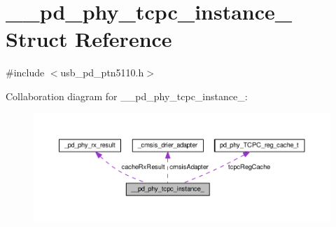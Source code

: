 \hypertarget{struct____pd__phy__tcpc__instance__}{\section{\-\_\-\-\_\-pd\-\_\-phy\-\_\-tcpc\-\_\-instance\-\_\- Struct Reference}
\label{struct____pd__phy__tcpc__instance__}
}


{\ttfamily \#include $<$usb\-\_\-pd\-\_\-ptn5110.\-h$>$}



Collaboration diagram for \-\_\-\-\_\-pd\-\_\-phy\-\_\-tcpc\-\_\-instance\-\_\-\-:
\nopagebreak
\begin{figure}[H]
\begin{center}
\leavevmode
\includegraphics[width=350pt]{struct____pd__phy__tcpc__instance____coll__graph}
\end{center}
\end{figure}
